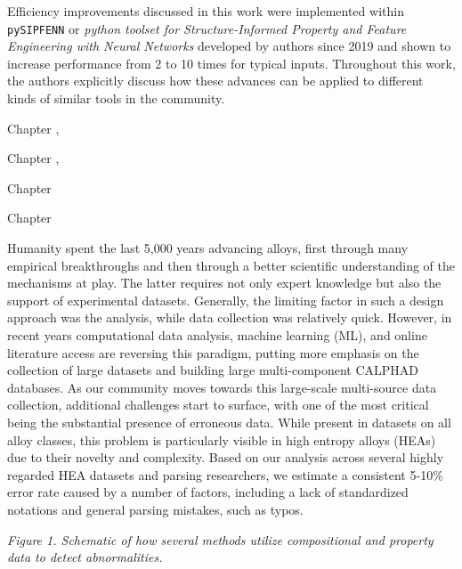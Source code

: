 Efficiency improvements discussed in this work were implemented within \texttt{pySIPFENN} or \textit{python toolset for Structure-Informed Property and Feature Engineering with Neural Networks} developed by authors since 2019 and shown to increase performance from 2 to 10 times for typical inputs. Throughout this work, the authors explicitly discuss how these advances can be applied to different kinds of similar tools in the community.





Chapter ,






Chapter ,






Chapter 





Chapter 


Humanity spent the last 5,000 years advancing alloys, first through many empirical breakthroughs and then through a better scientific understanding of the mechanisms at play. The latter requires not only expert knowledge but also the support of experimental datasets. Generally, the limiting factor in such a design approach was the analysis, while data collection was relatively quick. However, in recent years computational data analysis, machine learning (ML), and online literature access are reversing this paradigm, putting more emphasis on the collection of large datasets and building large multi-component CALPHAD databases.
As our community moves towards this large-scale multi-source data collection, additional challenges start to surface, with one of the most critical being the substantial presence of erroneous data. While present in datasets on all alloy classes, this problem is particularly visible in high entropy alloys (HEAs) due to their novelty and complexity. Based on our analysis across several highly regarded HEA datasets and parsing researchers, we estimate a consistent 5-10\% error rate caused by a number of factors, including a lack of standardized notations and general parsing mistakes, such as typos.

\vspace{24pt}
\textit{Figure 1. Schematic of how several methods utilize compositional and property data to detect abnormalities.}\\


